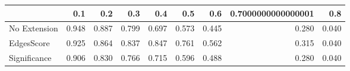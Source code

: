 \begin{tabular}{lrrrrrrrr}
\toprule
{} &   0.1 &   0.2 &   0.3 &   0.4 &   0.5 &   0.6 & 0.7000000000000001 &   0.8 \\
\midrule
No Extension & 0.948 & 0.887 & 0.799 & 0.697 & 0.573 & 0.445 &              0.280 & 0.040 \\
EdgesScore   & 0.925 & 0.864 & 0.837 & 0.847 & 0.761 & 0.562 &              0.315 & 0.040 \\
Significance & 0.906 & 0.830 & 0.766 & 0.715 & 0.596 & 0.488 &              0.280 & 0.040 \\
\bottomrule
\end{tabular}

